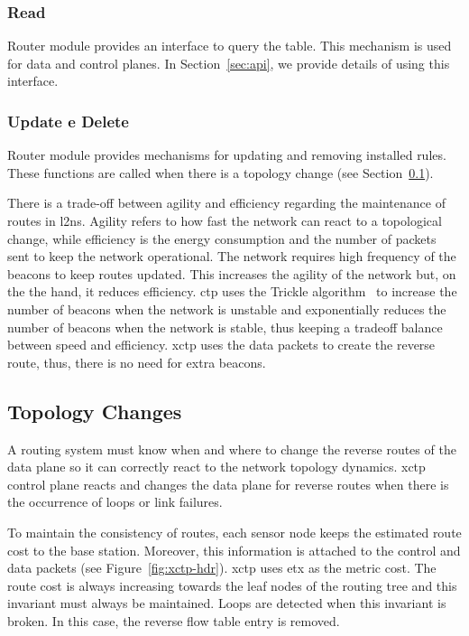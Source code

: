 \subsubsection{Read} Router module provides an interface to query the table. This
mechanism is used for data and control planes. In
Section~\ref{sec:api}, we provide details of using this interface.

\subsubsection{Update e Delete} Router module provides mechanisms for updating and removing
installed rules. These functions are called when there is a topology
change (see Section~\ref{sec:topology-changes}).

There is a trade-off between agility and efficiency regarding the
maintenance of routes in \ac{l2ns}. Agility refers to how fast the
network can react to a topological change, while efficiency is the
energy consumption and the number of packets sent to keep the
network operational. The network requires high frequency of the
beacons to keep routes updated. This increases the agility of the
network but, on the the hand, it reduces efficiency. \ac{ctp} uses
the Trickle algorithm~\cite{trickle} to increase the number of
beacons when the network is unstable and exponentially reduces the
number of beacons when the network is stable, thus keeping a
tradeoff balance between speed and efficiency. \ac{xctp} uses the
data packets to create the reverse route, thus, there is no need for
extra beacons.

\subsection{Topology Changes}
\label{sec:topology-changes}

A routing system must know when and where to change the reverse
routes of the data plane so it can correctly react to the network
topology dynamics. \ac{xctp} control plane reacts and changes the
data plane for reverse routes when there is the occurrence of loops
or link failures.

To maintain the consistency of routes, each sensor node keeps the
estimated route cost to the base station. Moreover, this information
is attached to the control and data packets (see
Figure~\ref{fig:xctp-hdr}). \ac{xctp} uses \ac{etx} as the metric
cost. The route cost is always increasing towards the leaf nodes of
the routing tree and this invariant must always be maintained. Loops
are detected when this invariant is broken. In this case, the
reverse flow table entry is removed.


